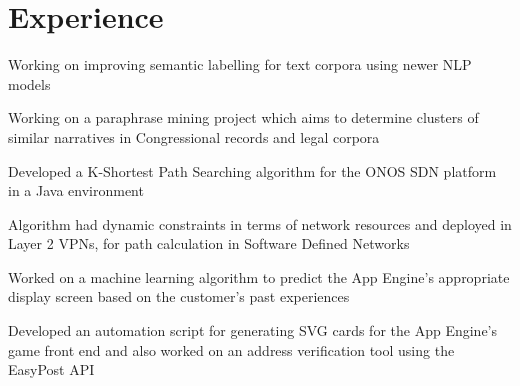 \documentclass[]{onepage}
\begin{document}
\begin{minipage}[t]{0.66\textwidth}

\section{Experience}
\vspace{0.4cm}
\begin{tightemize}
\item Working on improving semantic labelling for text corpora using newer NLP models
\item Working on a paraphrase mining project which aims to determine clusters of similar narratives in Congressional records and legal corpora
\end{tightemize}
\vspace{0.1cm}

\vspace{0.07cm} %
\begin{tightemize}
\item Developed a K-Shortest Path Searching algorithm for the ONOS SDN platform in a Java environment
\item Algorithm had dynamic constraints in terms of network resources  and deployed in Layer 2 VPNs, for path calculation in Software Defined Networks
\end{tightemize}
\vspace{0.1cm}

\vspace{0.03cm}
\begin{tightemize}
\item Worked on a machine learning algorithm to predict the App Engine's appropriate display screen based on the customer's past experiences
\item Developed an automation script for generating SVG cards for the App Engine's game front end and also worked on an address verification tool using the EasyPost API
\end{tightemize}
\vspace{0.01cm}


\end{minipage}
\end{document}
